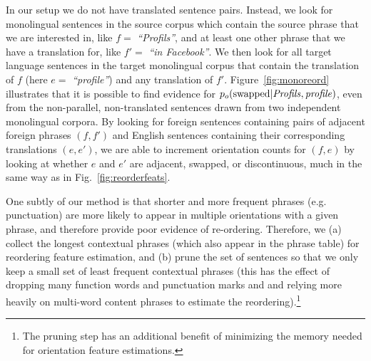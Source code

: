 \documentclass[11pt,letterpaper]{article}
\newcommand{\mnote}[1]{\marginpar{%
  \vskip-\baselineskip
  \raggedright\footnotesize
  \itshape\hrule\smallskip\tiny{#1}\par\smallskip\hrule}}
\newcommand{\mtodo}[1]{\mnote{\textcolor{red}{#1}}}
\newcommand{\figref}[1]{Figure~\ref{#1}}
\newcommand{\emq}[1]{\emph{``#1''}}
\begin{document}
In our setup we do not have translated sentence pairs.  Instead, we look for monolingual sentences in the source corpus which contain the source phrase that we are interested in, like $f =$ \emq{Profils}, and at least one other phrase that we have a translation for, like $f' =$ \emq{in Facebook}.  We then look for all target language sentences in the target monolingual corpus that contain the translation of $f$ (here $e =$ \emq{profile}) and any translation of $f'$.  \figref{fig:monoreord} illustrates that it is possible to find evidence for $p_o(\textnormal{swapped}| \it{ Profils},\it{ profile})$, even from the non-parallel, non-translated sentences drawn from two independent monolingual corpora.  By looking for foreign sentences containing pairs of adjacent foreign phrases $(f, f')$ and English sentences containing their corresponding translations $(e, e')$, we are able to increment orientation counts for $(f, e)$ by looking at whether $e$ and $e'$ are adjacent, swapped, or discontinuous, much in the same way as in Fig.~\ref{fig:reorderfeats}.

One subtly of our method is that \mtodo{Clearly define parameters so that we can tweak them in the evaluation section.}
shorter and more frequent phrases (e.g. punctuation) are more likely to appear in multiple orientations with a given phrase, and therefore provide poor evidence of re-ordering.  Therefore, we (a) collect the longest contextual phrases (which also appear in the phrase table) for reordering feature estimation, and (b) prune the set of sentences so that we only keep a small set of least frequent contextual phrases (this has the effect of dropping many function words and punctuation marks and and relying more heavily on multi-word content phrases to estimate the reordering).\footnote{The pruning step has an additional benefit of minimizing the memory needed for orientation feature estimations.}
\end{document}
